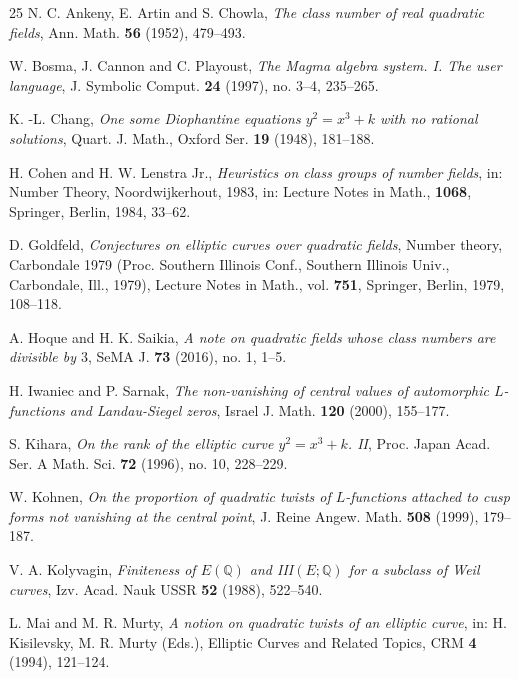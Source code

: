 \documentclass[12pt, 14paper,reqno]{amsart}
\theoremstyle{plain}
\theoremstyle{proof}
\numberwithin{equation}{section}
\begin{document}
\begin{thebibliography}{25}
 N. C. Ankeny, E. Artin and S. Chowla, {\it The class number of real quadratic fields}, Ann. Math. {\bf 56} (1952), 479--493.

 W. Bosma, J. Cannon and C. Playoust, {\it The Magma algebra system. I. The user language}, J. Symbolic Comput. {\bf 24} (1997), no. 3--4, 235--265. 

 K. -L. Chang, {\it One some Diophantine equations $y^{2}=x^{3}+k$ with no rational solutions}, Quart. J. Math., Oxford Ser. {\bf 19} (1948), 181--188.

 H. Cohen and H. W. Lenstra Jr., {\it Heuristics on class groups of number fields}, in: Number Theory, Noordwijkerhout, 1983, in: Lecture Notes in Math., {\bf 1068}, Springer, Berlin, 1984, 33--62.


 D. Goldfeld, {\it Conjectures on elliptic curves over quadratic fields}, Number theory, Carbondale 1979 (Proc. Southern Illinois Conf., Southern Illinois Univ., Carbondale, Ill., 1979), Lecture Notes in Math., vol. \textbf{751}, Springer, Berlin, 1979, 108--118.


 A. Hoque and H. K. Saikia, {\it A note on quadratic fields whose class numbers are divisible by $3$}, SeMA J. {\bf 73} (2016), no. 1, 1--5.

 H. Iwaniec and P. Sarnak, {\it The non-vanishing of central values of automorphic $L$-functions and Landau-Siegel zeros}, Israel J. Math. {\bf 120} (2000), 155--177.  

 S. Kihara, {\it On the rank of the elliptic curve $y^2=x^3+k$. II}, Proc. Japan Acad. Ser. A Math. Sci. {\bf 72} (1996), no. 10, 228--229.

 W. Kohnen, {\it On the proportion of quadratic twists of $L$-functions attached to cusp forms not vanishing at the central point}, J. Reine Angew. Math. {\bf 508} (1999), 179--187.  

 V. A. Kolyvagin, {\it Finiteness of $E(\mathbb{Q})$ and III$(E;\mathbb{Q})$ for a subclass of Weil curves}, Izv. Acad. Nauk USSR {\bf 52} (1988), 522--540.

 L. Mai and M. R. Murty, {\it A notion on quadratic twists of an elliptic curve}, in: H. Kisilevsky, M. R. Murty (Eds.), Elliptic Curves and Related Topics, CRM {\bf 4} (1994), 121--124.


\end{thebibliography}
\end{document}

